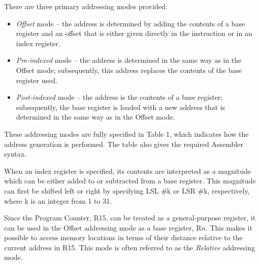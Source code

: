 \documentclass[11pt, twoside, pdftex]{article}
\begin{document}
There are three primary addressing modes provided:
\begin{itemize}
\item {\it Offset} mode -- the address is determined by adding
the contents of a base register and an offset that is either
given directly in the instruction or in an index register.
\item {\it Pre-indexed} mode -- the address is determined
in the same way as in the Offset mode; subsequently, this
address replaces the contents of the base register used. 
\item {\it Post-indexed} mode -- the address is the contents
of a base register; subsequently, the base register is loaded
with a new address that is determined in the same way as in
the Offset mode.
\end{itemize}

\noindent
These addressing modes are fully specified in Table 1, 
which indicates how the address generation is performed.
The table also gives the required Assembler syntax.

When an index register is specified, its contents are interpreted
as a magnitude which can be either added to or subtracted from 
a base register. This magnitude can first be shifted left or
right by specifying LSL \#k or LSR \#k, respectively, where k
is an integer from 1 to 31.

Since the Program Counter, R15, can be treated as a
general-purpose register, it can be used in the Offset
addressing mode as a base register, R$n$. This makes it possible
to access memory locations in terms of their 
distance relative to the current address in R15.
This mode is often referred to as the {\it Relative} addressing
mode. 
\end{document}
